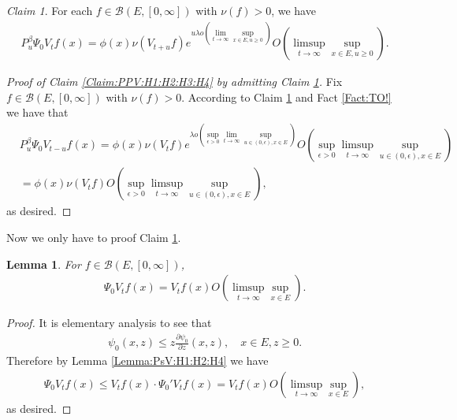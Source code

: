 \documentclass[12pt,a4paper]{amsart}
\numberwithin{equation}{section}
\theoremstyle{plain}
\newtheorem{lem}[thm]{Lemma}
\theoremstyle{definition}
\theoremstyle{remark}
\newtheorem{claim}[thm]{Claim}
\begin{document}
\begin{claim} \label{Claim:PuPVt:H1:H2:H3:H4} 
For each $f\in \mathcal B(E,[0,\infty])$ with $\nu(f)>0$, we have 
\begin{align}
 P_u^\beta \Psi_0 V_{t} f(x) 
 = \phi(x) \nu(V_{t+u}f) e^{u\lambda o(\lim_{t\to \infty} \sup_{x\in E, u\geq 0})} O(\limsup_{t\to \infty}\sup_{x\in E, u\geq 0}).
 \end{align}
\end{claim}
\begin{proof}[{Proof of Claim \ref{Claim:PPV:H1:H2:H3:H4} by admitting Claim \ref{Claim:PuPVt:H1:H2:H3:H4}}]
Fix $f\in \mathcal B(E,[0,\infty])$ with $\nu(f)>0$. 
According to Claim \ref{Claim:PuPVt:H1:H2:H3:H4} and Fact \ref{Fact:TO!} we have that
\begin{align}
 & P_u^\beta \Psi_0 V_{t-u} f(x) 
 = \phi(x) \nu(V_{t}f) e^{\lambda o(\sup_{\epsilon > 0}\lim_{t\to \infty} \sup_{u\in (0,\epsilon), x\in E})} O(\sup_{\epsilon > 0} \limsup_{t\to \infty}\sup_{u\in (0,\epsilon), x\in E})
 \\&= \phi(x)\nu(V_tf) O(\sup_{\epsilon > 0} \limsup_{t\to \infty} \sup_{u \in (0,\epsilon), x\in E}),
 \end{align}
as desired.
\end{proof}
Now we only have to proof Claim \ref{Claim:PuPVt:H1:H2:H3:H4}.
\begin{lem} \label{Lemma:PVtV:H1:H2:H4} 
For $f\in \mathcal B(E,[0,\infty])$,
\begin{align}
 \Psi_0 V_t f(x) 
 = V_tf(x) O(\limsup_{t\to \infty}\sup_{x\in E}).
 \end{align}
\end{lem}
\begin{proof}
It is elementary analysis to see that 
\begin{align}
 \psi_0(x,z) 
 \leq z \frac{\partial \psi_0}{\partial z} (x,z),
 \quad x\in E, z\geq 0.
 \end{align}
Therefore by Lemma \ref{Lemma:PsV:H1:H2:H4} we have
\begin{align}
 \Psi_0 V_t f (x) 
 \leq V_tf(x)\cdot \Psi_0' V_t f(x) 
 = V_tf(x) O(\limsup_{t\to \infty}\sup_{x\in E} ),
 \end{align}
as desired.
\end{proof}
\end{document}
